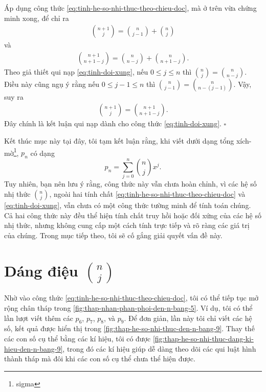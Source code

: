 \documentclass[12pt]{article} %
\begin{document}
Áp dụng công thức \eqref{eq:tinh-he-so-nhi-thuc-theo-chieu-doc}, mà ở trên vừa chứng minh xong, để chỉ ra
\begin{align*}
    \binom{n+1}{j}=\binom{n}{j-1}+\binom{n}{j}
\end{align*}
và
\begin{align*}
    \binom{n+1}{n+1-j}=\binom{n}{n-j}+\binom{n}{n+1-j}.
\end{align*}
Theo giả thiết qui nạp \eqref{eq:tinh-doi-xung}, nếu \(0\leq j\leq n\) thì \(\binom{n}{j}=\binom{n}{n-j}\). Điều này cũng ngụ ý rằng nếu \(0\leq j-1\leq n\) thì \(\binom{n}{j-1}=\binom{n}{n-(j-1)}\). Vậy, suy ra
\begin{align*}
    \binom{n+1}{j}=\binom{n+1}{n+1-j}.
\end{align*}
Đây chính là kết luận qui nạp dành cho công thức \eqref{eq:tinh-doi-xung}. \(\square\)

Kết thúc mục này tại đây, tôi tạm kết luận rằng, khi viết dưới dạng tổng xích-mờ\footnote{sigma}, \(p_n\) có dạng
\[p_n=\sum_{j=0}^n\binom{n}{j}x^j.\] 
Tuy nhiên, bạn nên lưu ý rằng, công thức này vẫn chưa hoàn chỉnh, vì các hệ số nhị thức \(\binom{n}{j}\), ngoài hai tính chất \eqref{eq:tinh-he-so-nhi-thuc-theo-chieu-doc} và \eqref{eq:tinh-doi-xung}, vẫn chưa có một công thức tường minh để tính toán chúng. Cả hai công thức này đều thể hiện tính chất truy hồi hoặc đối xứng của các hệ số nhị thức, nhưng không cung cấp một cách tính trực tiếp và rõ ràng các giá trị của chúng. Trong mục tiếp theo, tôi sẽ cố gắng giải quyết vấn đề này.


\section{Dáng điệu \texorpdfstring{\protect\(\binom{n}{j}\)}{hệ số nhị thức}}

Nhờ vào công thức \eqref{eq:tinh-he-so-nhi-thuc-theo-chieu-doc}, tôi có thể tiếp tục mở rộng chân tháp trong \autoref{fig:thap-nhan-phan-phoi-den-n-bang-5}. Ví dụ, tôi có thể lần lượt viết thêm các \(p_6\), \(p_7\), \(p_8\), và \(p_9\). Để đơn giản, lần này tôi chỉ viết các hệ số, kết quả được hiển thị trong \autoref{fig:thap-he-so-nhi-thuc-den-n-bang-9}. Thay thế các con số cụ thể bằng các kí hiệu, tôi có được \autoref{fig:thap-he-so-nhi-thuc-dang-ki-hieu-den-n-bang-9}, trong đó các kí hiệu giúp dễ dàng theo dõi các qui luật hình thành tháp mà đôi khi các con số cụ thể chưa thể hiện được. 
\end{document}
